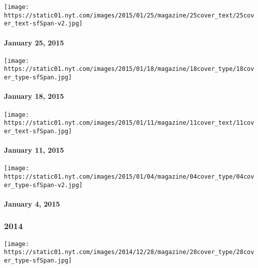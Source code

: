 \href{http://www.nytimes.com/indexes/2015/01/25/magazine/index.html}{}

\texttt{[image: https://static01.nyt.com/images/2015/01/25/magazine/25cover\_text/25cover\_text-sfSpan-v2.jpg]}

\hypertarget{january-25-2015}{%
\paragraph{January 25, 2015}\label{january-25-2015}}

\href{http://www.nytimes.com/indexes/2015/01/18/magazine/index.html}{}

\texttt{[image: https://static01.nyt.com/images/2015/01/18/magazine/18cover\_type/18cover\_type-sfSpan.jpg]}

\hypertarget{january-18-2015}{%
\paragraph{January 18, 2015}\label{january-18-2015}}

\href{http://www.nytimes.com/indexes/2015/01/11/magazine/index.html}{}

\texttt{[image: https://static01.nyt.com/images/2015/01/11/magazine/11cover\_text/11cover\_text-sfSpan.jpg]}

\hypertarget{january-11-2015}{%
\paragraph{January 11, 2015}\label{january-11-2015}}

\href{http://www.nytimes.com/indexes/2015/01/04/magazine/index.html}{}

\texttt{[image: https://static01.nyt.com/images/2015/01/04/magazine/04cover\_type/04cover\_type-sfSpan-v2.jpg]}

\hypertarget{january-4-2015}{%
\paragraph{January 4, 2015}\label{january-4-2015}}

\hypertarget{2014}{%
\subsubsection{2014}\label{2014}}

\href{http://www.nytimes.com/indexes/2014/12/27/magazine/index.html}{}

\texttt{[image: https://static01.nyt.com/images/2014/12/28/magazine/28cover\_type/28cover\_type-sfSpan.jpg]}

